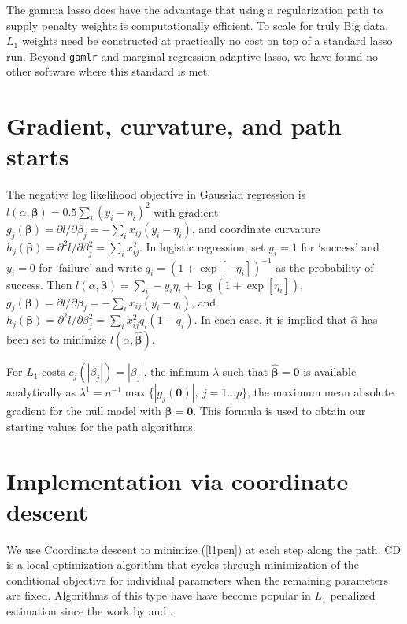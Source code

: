 \documentclass[12pt]{article}
\newcommand{\bs}[1]{\boldsymbol{#1}}
\newcommand{\bm}[1]{\mathbf{#1}}
\begin{document}
The gamma lasso does have the advantage that using a regularization path to
supply penalty weights is computationally efficient. To scale for truly Big
data, $L_1$ weights need be constructed at practically no cost on top of a
standard lasso run. Beyond {\tt gamlr} and marginal regression adaptive lasso,
we have found no other software where this standard is met.

\newpage
\appendix
\vskip 1cm

\section{Gradient, curvature, and path starts}
\label{models}

The negative log likelihood objective in Gaussian regression is $
l(\alpha,\bs{\beta}) = 0.5\sum_i (y_i -\eta_i)^2 $ with gradient
$g_j(\bs{\beta}) = \partial l/\partial \beta_j = -\sum_i x_{ij}(y_i -
\eta_i)$, and coordinate curvature $h_j(\bs{\beta}) = \partial^2 l/\partial
\beta_j^2 = \sum_i x_{ij}^2$. In logistic regression, set $y_i = 1$ for
`success' and $y_i = 0$ for `failure' and write $q_i = (1 +
\exp[-\eta_i])^{-1}$ as the probability of success.  Then
$l(\alpha,\bs{\beta}) = \sum_i -y_i\eta_i + \log(1 +
  \exp[\eta_i])$,
$
g_j(\bs{\beta}) = \partial l/\partial \beta_j = -\sum_i
x_{ij}(y_i - q_i)$, and
$h_j(\bs{\beta}) = \partial^2 l/\partial \beta_j^2 = \sum_i
x_{ij}^2q_i(1-q_i)
$.
In each case, it is implied that $\hat\alpha$ has been set
to minimize $l(\alpha,\bs{\hat\beta})$. 

For $L_1$ costs $c_j(|\beta_j|) = |\beta_j|$, the infimum $\lambda$ such
that $\bs{\hat\beta} = \bm{0}$ is  available analytically as
$\lambda^1 =
n^{-1}\max\{|g_j(\bm{0})|,~j=1\ldots p\}$, the maximum mean
absolute gradient for the null model with $\bs{\beta} = \bm{0}$.  This formula
is used to obtain our starting values for the path algorithms.

\section{Implementation via coordinate descent}
\label{implement}

We use Coordinate descent \citep[CD; e.g.,][]{luenberger_linear_2008} to minimize
(\ref{l1pen}) at each step along the path. CD is a local optimization
algorithm that cycles through minimization of the conditional objective for
individual parameters when the remaining parameters are fixed. Algorithms of this type have have become popular in
$L_1$ penalized estimation since the work by \citet{friedman_pathwise_2007} and
\citet{wu_coordinate_2008}.
\end{document}
